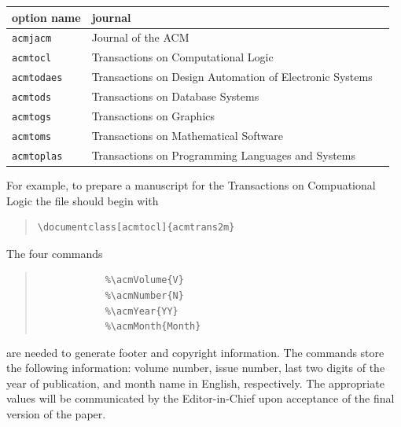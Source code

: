 \documentclass[acmtocl]{acmtrans2m}
\begin{document}
\medskip
\begin{tabular}{l l l}
        option name & journal\\
\hline
        \verb|acmjacm| & Journal of the ACM\\
        \verb|acmtocl| & Transactions on Computational Logic\\
        \verb|acmtodaes| & Transactions on Design Automation of Electronic Systems\\
        \verb|acmtods| & Transactions on Database Systems\\
        \verb|acmtogs| & Transactions on Graphics\\
        \verb|acmtoms| & Transactions on Mathematical Software\\
        \verb|acmtoplas| & Transactions on Programming Languages and Systems\\
\end{tabular}

\medskip\noindent For example, to prepare a manuscript for the
Transactions on Compuational Logic the file should begin with
\begin{quote}
\begin{verbatim}
\documentclass[acmtocl]{acmtrans2m}
\end{verbatim}
\end{quote}


\medskip\noindent
The four commands
\begin{quote}
\begin{verbatim}
            %\acmVolume{V}
            %\acmNumber{N}
            %\acmYear{YY}
            %\acmMonth{Month}
\end{verbatim}
\end{quote}
are needed to generate footer and copyright information. The commands
store the following information: volume number, issue number, last two
digits of the year of publication, and month name in English,
respectively. The appropriate values will be communicated by the
Editor-in-Chief upon acceptance of the final version of the paper.
\end{document}

